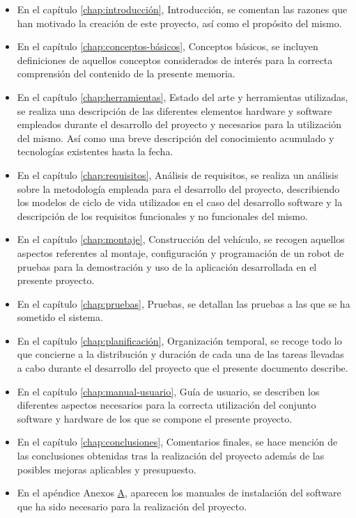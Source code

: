 \begin{itemize}

\item En el capítulo \ref{chap:introducción}, Introducción, se comentan las razones que han motivado la creación de este proyecto, así como el propósito del mismo.

\item En el capítulo \ref{chap:conceptos-básicos}, Conceptos básicos, se incluyen definiciones de aquellos conceptos considerados de interés para la correcta comprensión del contenido de la presente memoria.

\item En el capítulo \ref{chap:herramientas}, Estado del arte y herramientas utilizadas, se realiza una descripción de las diferentes elementos hardware y software empleados durante el desarrollo del proyecto y necesarios para la utilización del mismo. Así como una breve descripción del conocimiento acumulado y tecnologías existentes hasta la fecha.

\item En el capítulo \ref{chap:requisitos}, Análisis de requisitos, se realiza un análisis sobre la metodología empleada para el desarrollo del proyecto, describiendo
los modelos de ciclo de vida utilizados en el caso del desarrollo software y la descripción de los requisitos funcionales y no funcionales del mismo.

\item En el capítulo \ref{chap:montaje}, Construcción del vehículo, se recogen aquellos aspectos referentes al montaje, configuración y programación de un robot de pruebas para la demostración y uso de la aplicación desarrollada en el presente proyecto. 

\item En el capítulo \ref{chap:pruebas}, Pruebas, se detallan las pruebas a las que se ha sometido el sistema.

\item En el capítulo \ref{chap:planificación}, Organización temporal, se recoge todo lo que concierne a la distribución y duración de cada una de las tareas llevadas a cabo durante el desarrollo del proyecto que el presente documento describe.

\item En el capítulo \ref{chap:manual-usuario}, Guía de usuario, se describen los diferentes aspectos necesarios para la correcta utilización del conjunto software y hardware de los que se compone el presente proyecto.

\item En el capítulo \ref{chap:conclusiones}, Comentarios finales, se hace mención de las conclusiones obtenidas tras la realización del proyecto además de las posibles mejoras aplicables y presupuesto.

\item En el apéndice Anexos  \hyperref[appendix:anexos]{A}, aparecen los manuales de instalación del software que ha sido necesario para la realización del proyecto.

\end{itemize}
